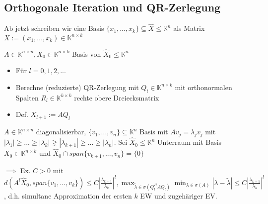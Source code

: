 \subsection{Orthogonale Iteration und QR-Zerlegung}

\begin{remark}
	Ab jetzt schreiben wir eine Basis $\{x_1, ..., x_k\} \subseteq \hat{X} \leq \mathbb{K}^n$ als Matrix $X:=(x_1, ..., x_k) \in \mathbb{K}^{n\times k}$
\end{remark}

\begin{algorithm}
	$A \in \mathbb{K}^{n\times n}, X_0 \in \mathbb{K}^{n\times k}$ Basis von $\hat{X}_0 \leq \mathbb{K}^n$
	\begin{itemize}
		\item Für $l=0,1,2,...$
		\item \hspace{0.5cm} Berechne (reduzierte) QR-Zerlegung mit $Q_l \in \mathbb{K}^{n\times k}$ mit orthonormalen Spalten $R_l \in \mathbb{K}^{k\times k}$ rechte obere Dreiecksmatrix
		\item Def. $X_{l+1} := AQ_l$
	\end{itemize}
\end{algorithm}

\begin{theorem}
	$A \in \mathbb{K}^{n\times n}$ diagonalisierbar, $\{v_1, ..., v_n\} \subseteq \mathbb{K}^n$ Basis mit $Av_j = \lambda_j v_j$ mit $|\lambda_1| \geq ... \geq |\lambda_k| \gneq |\lambda_{k+1}| \geq ... \geq |\lambda_n|$. Sei $\hat{X}_0 \leq \mathbb{K}^n$ Unterraum mit Basis $X_0 \in \mathbb{K}^{n\times k}$ und $\hat{X}_0 \cap span\{v_{k+1}, ..., v_n\} = \{0\}$
	
	$\implies$ Ex. $C>0$ mit $d(A^l\hat{X}_0, span\{v_1, ..., v_k\}) \leq C \left|\frac{\lambda_{k+1}}{\lambda_k}\right|^l, \max_{\tilde{\lambda} \in \sigma(Q_l^HAQ_l)} \min_{\lambda \in \sigma(A)} |\lambda - \tilde{\lambda}| \leq C \left|\frac{\lambda_{k+1}}{\lambda_k}\right|^l$, d.h. simultane Approximation der ersten $k$ EW und zugehäriger EV.
\end{theorem}

